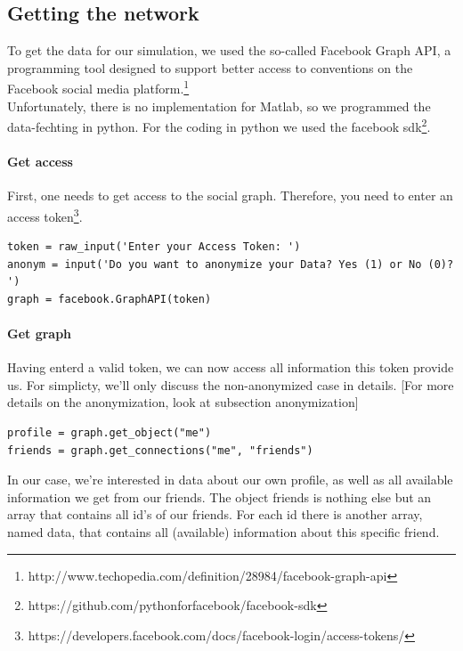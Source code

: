 
\subsection{Getting the network} 

To get the data for our simulation, we used the so-called Facebook Graph API, a programming tool designed to support better access to conventions on the Facebook social media platform.\footnote{http://www.techopedia.com/definition/28984/facebook-graph-api} 
\\
Unfortunately, there is no implementation for Matlab, so we programmed the data-fechting in python. For the coding in python we used the facebook sdk\footnote{https://github.com/pythonforfacebook/facebook-sdk}. 

\paragraph{Get access}

First, one needs to get access to the social graph. Therefore, you need to enter an access token\footnote{https://developers.facebook.com/docs/facebook-login/access-tokens/}. 

\begin{lstlisting} 
token = raw_input('Enter your Access Token: ')
anonym = input('Do you want to anonymize your Data? Yes (1) or No (0)? ')
graph = facebook.GraphAPI(token)

\end{lstlisting}

\paragraph{Get graph}

Having enterd a valid token, we can now access all information this token provide us.  For simplicty, we'll only discuss  the non-anonymized case in details. [For more details on the anonymization, look at subsection anonymization]

\begin{lstlisting} 
profile = graph.get_object("me")
friends = graph.get_connections("me", "friends")
\end{lstlisting}

In our case, we're interested in data about our own profile, as well as all available information we get from our friends.
The object friends is nothing else but an array that contains all id's of our friends. For each id there is another array, named data, that contains all (available) information about this specific friend.  

